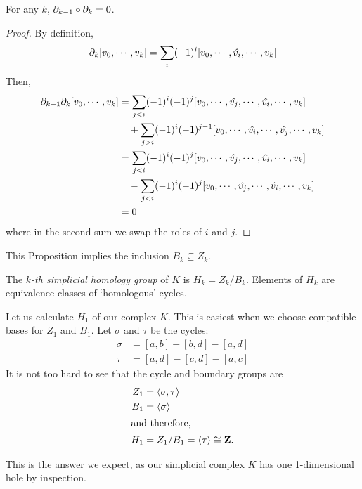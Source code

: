 \begin{proposition}
For any $k$, $\partial_{k-1} \circ \partial_k = 0$.
\end{proposition}
\begin{proof}
By definition,
\begin{align*}
\partial_k[v_0, \cdots, v_k] = \sum_i (-1)^i [v_0, \cdots, \hat{v_i}, \cdots, v_k]
\end{align*}
Then,
\begin{align*}
\partial_{k-1}\partial_k[v_0, \cdots, v_k] &= \sum_{j<i} (-1)^i (-1)^j [v_0, \cdots, \hat{v_j}, \cdots, \hat{v_i}, \cdots, v_k] \\
& \quad + \sum_{j>i} (-1)^i (-1)^{j-1} [v_0, \cdots, \hat{v_i}, \cdots, \hat{v_j}, \cdots, v_k] \\
&= \sum_{j<i} (-1)^i (-1)^j [v_0, \cdots, \hat{v_j}, \cdots, \hat{v_i}, \cdots, v_k] \\
& \quad - \sum_{j<i} (-1)^i (-1)^j [v_0, \cdots, \hat{v_j}, \cdots, \hat{v_i}, \cdots, v_k] \\
&= 0
\end{align*}
where in the second sum we swap the roles of $i$ and $j$.
\end{proof}

This Proposition implies the inclusion $B_k \subseteq Z_k$.

\begin{definition}
The \emph{$k$-th simplicial homology group} of $K$ is $H_k = Z_k / B_k$. Elements of $H_k$ are equivalence classes of `homologous' cycles.
\end{definition}

\begin{example}
Let us calculate $H_1$ of our complex $K$. This is easiest when we choose compatible bases for $Z_1$ and $B_1$. Let $\sigma$ and $\tau$ be the cycles:
\begin{align*}
  \sigma &= [a, b] + [b, d] - [a, d] \\
  \tau &= [a, d] - [c, d] - [a, c]
\end{align*}
It is not too hard to see that the cycle and boundary groups are
\begin{align*}
  Z_1 &= \langle \sigma, \tau \rangle \\
  B_1 &= \langle \sigma \rangle \\
\intertext{and therefore,}
  H_1 &= Z_1 / B_1 = \langle \tau \rangle \cong \mathbf{Z}.
\end{align*}

This is the answer we expect, as our simplicial complex $K$ has one 1-dimensional hole by inspection.
\end{example}

